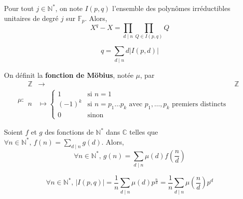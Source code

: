 	\begin{theorem}
		Pour tout $j \in \mathbb{N}^*$, on note $I(p,q)$ l'ensemble des polynômes irréductibles unitaires de degré $j$ sur $\mathbb{F}_p$. Alors,
		\[ X^q - X = \prod_{d \mid n} \prod_{Q \in I(p,q)} Q \]
	\end{theorem}

	\begin{corollary}
		\[ q = \sum_{d \mid n} d \vert I(p,d) \vert \]
	\end{corollary}

	\begin{definition}
		On définit la \textbf{fonction de Möbius}, notée $\mu$, par
		\[
			\mu :
			\begin{array}{ccc}
				\mathbb{Z} &\rightarrow& \mathbb{Z} \\
				n &\mapsto \begin{cases}
					1 &\text{si } n = 1 \\
					(-1)^k &\text{si } n = p_1 \dots p_k \text{ avec } p_1, \dots, p_k \text{ premiers distincts} \\
					0 &\text{sinon}
				\end{cases}
			\end{array}
		\]
	\end{definition}

	\begin{theorem}
		Soient $f$ et $g$ des fonctions de $\mathbb{N}^*$ dans $\mathbb{C}$ telles que $\forall n \in \mathbb{N}^*, \, f(n) = \sum_{d \mid n} g(d)$. Alors,
		\[ \forall n \in \mathbb{N}^*, \, g(n) = \sum_{d \mid n} \mu(d) f \left( \frac{n}{d} \right) \]
	\end{theorem}

	\begin{corollary}
		\[ \forall n \in \mathbb{N}^*, \, \vert I(p,q) \vert = \frac{1}{n} \sum_{d \mid n} \mu(d) p^{\frac{n}{d}} = \frac{1}{n} \sum_{d \mid n} \mu \left( \frac{n}{d} \right) p^{d} \]
	\end{corollary}

